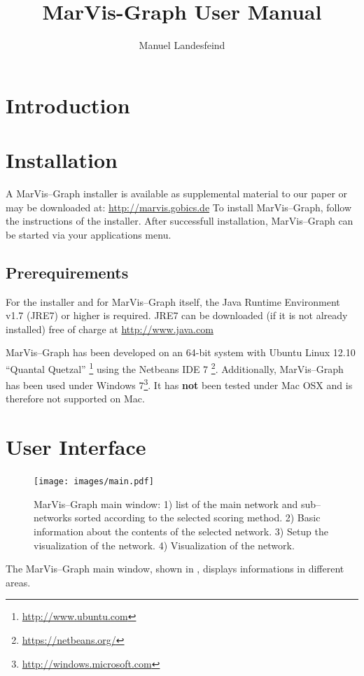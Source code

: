 \documentclass[titlepage,a4paper,twoside]{article}
\title{MarVis-Graph User Manual}
\author{Manuel Landesfeind}
\newcommand{\mg}{MarVis--Graph\xspace}
\newcommand{\pref}[1]{\prettyref{#1}}
\begin{document}
\maketitle

\section{Introduction}


\section{Installation}

A \mg installer is available as supplemental material to our paper
\cite{landesfeind2013marvisgraph} or may be downloaded at:
\url{http://marvis.gobics.de}
To install \mg, follow the instructions of the installer. After successfull
installation, \mg can be started via your applications menu.

\subsection{Prerequirements} For the installer and for \mg itself, the Java
Runtime Environment v1.7 (JRE7) or higher is required. JRE7 can be downloaded
(if it is not already installed) free of charge at \url{http://www.java.com}

\mg has been developed on an 64-bit system with Ubuntu Linux 12.10 ``Quantal Quetzal''
\footnote{\url{http://www.ubuntu.com}} using the Netbeans IDE 7
\footnote{\url{https://netbeans.org/}}. Additionally, \mg has been used under
Windows 7\footnote{\url{http://windows.microsoft.com}}. It has \textbf{not}
been tested under Mac OSX and is therefore not supported on Mac. 

\section{User Interface}
\begin{figure}
	\texttt{[image: images/main.pdf]}
	\caption[\mg main window]{\mg main window: 1) list of the main network and
		sub--networks sorted according to the selected scoring method. 2)
		Basic information about the contents of the selected network. 3) Setup
		the visualization of the network. 4) Visualization of the network.
		\label{fig:main}}
\end{figure}
The \mg main window, shown in \pref{fig:main}, displays informations in
different areas.
\end{document}
